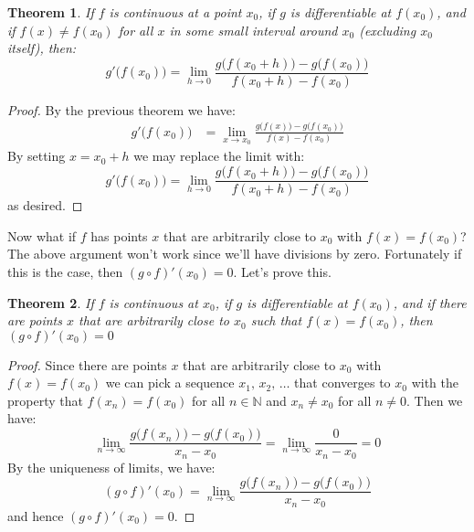 \documentclass{article}
\theoremstyle{plain}
\newtheorem{theorem}{Theorem}
\begin{document}
    \begin{theorem}
        If $f$ is continuous at a point $x_{0}$, if $g$ is differentiable at
        $f(x_{0})$, and if $f(x)\ne{f}(x_{0})$ for all $x$ in some small
        interval around $x_{0}$ (excluding $x_{0}$ itself),
        then:
        \begin{equation}
            g'\big(f(x_{0})\big)=
                \lim_{h\rightarrow{0}}
                \frac{g\big(f(x_{0}+h)\big)-g\big(f(x_{0})\big)}{f(x_{0}+h)-f(x_{0})}
        \end{equation}
    \end{theorem}
    \begin{proof}
        By the previous theorem we have:
        \begin{align}
            g'\big(f(x_{0})\big)
            &=\lim_{x\rightarrow{x}_{0}}
                \frac{g\big(f(x)\big)-g\big(f(x_{0})\big)}{f(x)-f(x_{0})}
        \end{align}
        By setting $x=x_{0}+h$ we may replace the limit with:
        \begin{equation}
            g'\big(f(x_{0})\big)=
                \lim_{h\rightarrow{0}}
                \frac{g\big(f(x_{0}+h)\big)-g\big(f(x_{0})\big)}{f(x_{0}+h)-f(x_{0})}
        \end{equation}
        as desired.
    \end{proof}
    Now what if $f$ has points $x$ that are arbitrarily close to $x_{0}$ with
    $f(x)=f(x_{0})$? The above argument won't work since we'll have divisions
    by zero. Fortunately if this is the case, then $(g\circ{f})'(x_{0})=0$.
    Let's prove this.
    \begin{theorem}
        If $f$ is continuous at $x_{0}$, if $g$ is differentiable at $f(x_{0})$,
        and if there are points $x$ that are arbitrarily close to $x_{0}$ such
        that $f(x)=f(x_{0})$, then $(g\circ{f})'(x_{0})=0$
    \end{theorem}
    \begin{proof}
        Since there are points $x$ that are arbitrarily close to $x_{0}$ with
        $f(x)=f(x_{0})$ we can pick a sequence $x_{1},\,x_{2},\,\dots$ that
        converges to $x_{0}$ with the property that $f(x_{n})=f(x_{0})$ for all
        $n\in\mathbb{N}$ and $x_{n}\ne{x}_{0}$ for all $n\ne{0}$. Then we have:
        \begin{equation}
            \lim_{n\rightarrow\infty}
                \frac{g\big(f(x_{n})\big)-g\big(f(x_{0})\big)}{x_{n}-x_{0}}
            =\lim_{n\rightarrow\infty}
                \frac{0}{x_{n}-x_{0}}
            =0
        \end{equation}
        By the uniqueness of limits, we have:
        \begin{equation}
            (g\circ{f})'(x_{0})
            =\lim_{n\rightarrow\infty}
                \frac{g\big(f(x_{n})\big)-g\big(f(x_{0})\big)}{x_{n}-x_{0}}
        \end{equation}
        and hence $(g\circ{f})'(x_{0})=0$.
    \end{proof}
\end{document}

